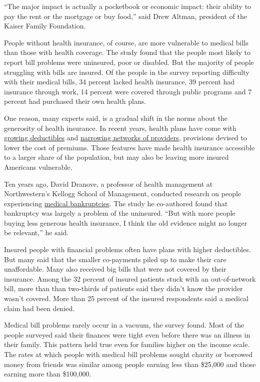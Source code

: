 ``The major impact is actually a pocketbook or economic impact: their
ability to pay the rent or the mortgage or buy food,'' said Drew Altman,
president of the Kaiser Family Foundation.

People without health insurance, of course, are more vulnerable to
medical bills than those with health coverage. The study found that the
people most likely to report bill problems were uninsured, poor or
disabled. But the majority of people struggling with bills are insured.
Of the people in the survey reporting difficulty with their medical
bills, 34 percent lacked health insurance, 39 percent had insurance
through work, 14 percent were covered through public programs and 7
percent had purchased their own health plans.

One reason, many experts said, is a gradual shift in the norms about the
generosity of health insurance. In recent years, health plans have come
with
\href{http://www.nytimes.com/2015/09/23/business/health-insurance-deductibles-outpacing-wage-increases-study-finds.html}{growing
deductibles} and
\href{http://www.nytimes.com/2014/07/30/upshot/why-health-insurance-plans-with-narrow-networks-are-here-to-stay.html}{narrowing
networks of providers}, provisions devised to lower the cost of
premiums. Those features have made health insurance accessible to a
larger share of the population, but may also be leaving more insured
Americans vulnerable.

Ten years ago, David Dranove, a professor of health management at
Northwestern's Kellogg School of Management, conducted research on
people experiencing
\href{http://content.healthaffairs.org/content/25/2/w74.full}{medical
bankruptcies}. The study he co-authored found that bankruptcy was
largely a problem of the uninsured. ``But with more people buying less
generous health insurance, I think the old evidence might no longer be
relevant,'' he said.

Insured people with financial problems often have plans with higher
deductibles. But many said that the smaller co-payments piled up to make
their care unaffordable. Many also received big bills that were not
covered by their insurance. Among the 32 percent of insured patients
stuck with an out-of-network bill, more than than two-thirds of patients
said they didn't know the provider wasn't covered. More than 25 percent
of the insured respondents said a medical claim had been denied.

Medical bill problems rarely occur in a vacuum, the survey found. Most
of the people surveyed said their finances were tight even before there
was an illness in their family. This pattern held true even for families
higher on the income scale. The rates at which people with medical bill
problems sought charity or borrowed money from friends was similar among
people earning less than \$25,000 and those earning more than \$100,000.

